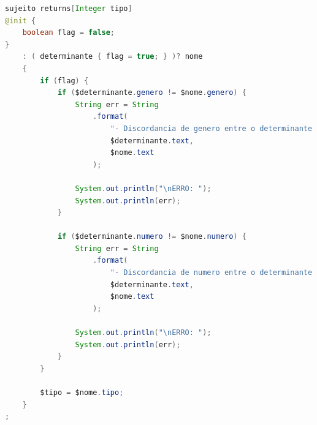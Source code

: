 \begin{center}
\begin{minipage}{13cm}
\begin{lstlisting}[language=java, basicstyle=\tiny, label={sujeito_dsl_excerpt}, caption=Example of gender/number validation within the ``sujeito'' production]
sujeito returns[Integer tipo]
@init {
    boolean flag = false;
}
    : ( determinante { flag = true; } )? nome
    {
        if (flag) {
            if ($determinante.genero != $nome.genero) {
                String err = String
                    .format(
                        "- Discordancia de genero entre o determinante '%s' e o nome '%s'.",
                        $determinante.text,
                        $nome.text
                    );

                System.out.println("\nERRO: ");
                System.out.println(err);
            }

            if ($determinante.numero != $nome.numero) {
                String err = String
                    .format(
                        "- Discordancia de numero entre o determinante '%s' e o nome '%s'.",
                        $determinante.text,
                        $nome.text
                    );

                System.out.println("\nERRO: ");
                System.out.println(err);
            }
        }

        $tipo = $nome.tipo;
    }
;
\end{lstlisting}
\end{minipage}
\end{center}

%
%
%
%

